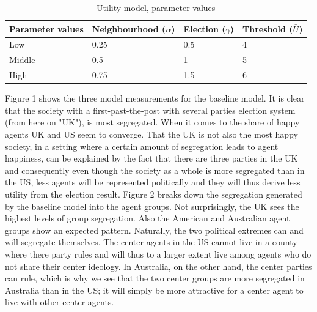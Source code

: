 \documentclass[12pt, a4paper]{article}
\begin{document}
	\begin{table}[ht]
		\centering
		\caption{Utility model, parameter values}
		\begin{tabular}{llll}
			\hline
			Parameter values & Neighbourhood ($\alpha$) & Election ($\gamma$) & Threshold ($\bar{U}$) \\ 
			\hline \hline
			Low & 0.25 & 0.5 & 4 \\ 
			Middle & 0.5 & 1 & 5 \\ 
			High & 0.75 & 1.5 & 6 \\ \hline
			\hline
		\end{tabular}
	\end{table}
	
	Figure 1 shows the three model measurements for the baseline model. It is clear that the society with a first-past-the-post with several parties election system (from here on "UK"), is most segregated. When it comes to the share of happy agents UK and US seem to converge. That the UK is not also the most happy society, in a setting where a certain amount of segregation leads to agent happiness, can be explained by the fact that there are three parties in the UK and consequently even though the society as a whole is more segregated than in the US, less agents will be represented politically and they will thus derive less utility from the election result. Figure 2 breaks down the segregation generated by the baseline model into the agent groups. Not surprisingly, the UK sees the highest levels of group segregation. Also the American and Australian agent groups show an expected pattern. Naturally, the two political extremes can and will segregate themselves. The center agents in the US cannot live in a county where there party rules and will thus to a larger extent live among agents who do not share their center ideology. In Australia, on the other hand, the center parties can rule, which is why we see that the two center groups are more segregated in Australia than in the US; it will simply be more attractive for a center agent to live with other center agents. \newline \newline
\end{document}
